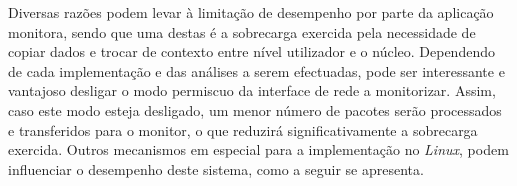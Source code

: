 Diversas razões podem levar à limitação de desempenho por parte da aplicação monitora, sendo que uma destas é a sobrecarga exercida pela necessidade de copiar dados e trocar de contexto entre nível utilizador e o núcleo.
Dependendo de cada implementação e das análises a serem efectuadas, pode ser interessante e vantajoso desligar o modo permiscuo da interface de rede a monitorizar.
Assim, caso este modo esteja desligado, um menor número de pacotes serão processados e transferidos para o monitor, o que reduzirá significativamente a sobrecarga exercida.
Outros mecanismos em especial para a implementação no \textit{Linux}, podem influenciar o desempenho deste sistema, como a seguir se apresenta.
 




